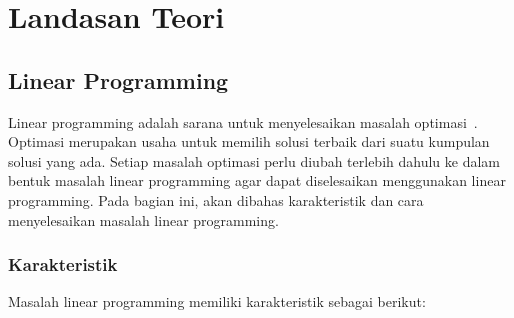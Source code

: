 \chapter{Landasan Teori}
\label{chap:teori}

\section{Linear Programming}

Linear programming adalah sarana untuk menyelesaikan masalah optimasi~\cite{winston2004operations}. Optimasi merupakan usaha untuk memilih solusi terbaik dari suatu kumpulan solusi yang ada. Setiap masalah optimasi perlu diubah terlebih dahulu ke dalam bentuk masalah linear programming agar dapat diselesaikan menggunakan linear programming. Pada bagian ini, akan dibahas karakteristik dan cara menyelesaikan masalah linear programming.

\subsection{Karakteristik}
Masalah linear programming memiliki karakteristik sebagai berikut:

